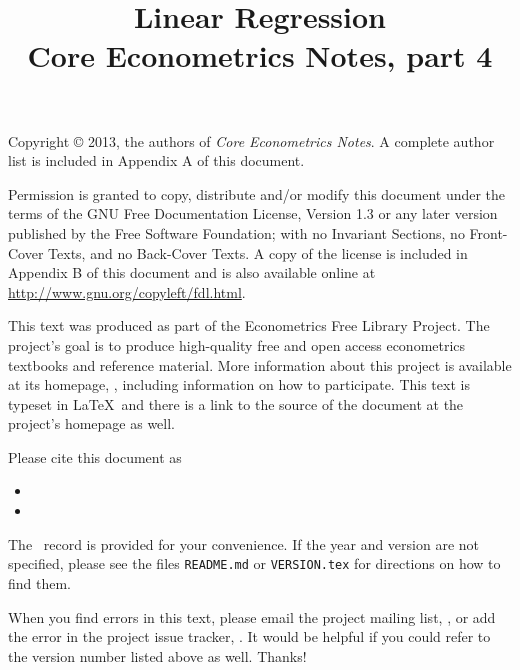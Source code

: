 \documentclass[nohyper]{tufte-handout}
\title[Linear regression]%
{Linear Regression \\
  Core Econometrics Notes, part 4}
\begin{document}
\maketitle

\bigskip\noindent%
Copyright © 2013, the authors of \textit{Core Econometrics Notes}.
A complete author list is included in Appendix A of this document.

Permission is granted to copy, distribute and/or modify this document
under the terms of the GNU Free Documentation License, Version 1.3 or
any later version published by the Free Software Foundation; with no
Invariant Sections, no Front-Cover Texts, and no Back-Cover Texts.  A
copy of the license is included in Appendix B of this document and is
also available online at \url{http://www.gnu.org/copyleft/fdl.html}.

This text was produced as part of the Econometrics Free Library
Project.  The project's goal is to produce high-quality free and
open access econometrics textbooks and reference material.  More
information about this project is available at its homepage,
\homepage, including information on how
to participate.  This text is typeset in \LaTeX\ and there is a link
to the source of the document at the project's homepage as well.

Please cite this document as
\begin{itemize}
\item[] 
\item[] 
\end{itemize}
The \BibTeX\ record is provided for your convenience.
If the year and version are not specified, please see the files
\texttt{README.md} or \texttt{VERSION.tex} for directions on how to
find them.

When you find errors in this text, please email the project mailing
list, \maillist, or add the error in the project issue tracker,
\bugtrack.  It would be helpful if you could refer to the version
number listed above as well.  Thanks!

\tableofcontents









\end{document}
